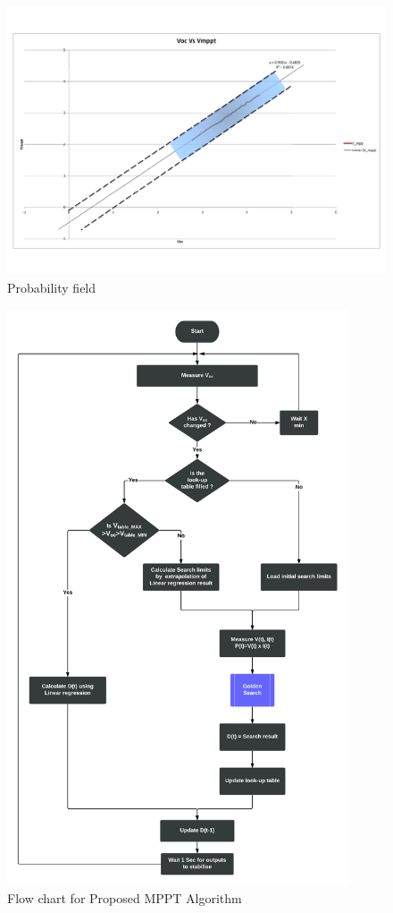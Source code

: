 \begin{figure}[H]
  \begin{center}
  \includegraphics[width=1.1\textwidth]{images/Probability_field}
  \caption{Probability field }
  \label{fig:Probability_field}
  \end{center}
\end{figure}

  \begin{figure}[H]
   \begin{center}
   \includegraphics[width=0.9\textwidth]{images/Proposed_Flow}
   \caption{ Flow chart for Proposed MPPT Algorithm }
   \label{fig:cyflow}
   \end{center}
  \end{figure}






